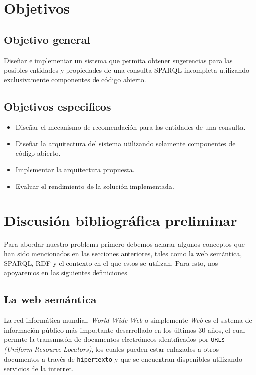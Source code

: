 \documentclass[conference,compsoc]{IEEEtran}
\begin{document}
\section{Objetivos}

    \subsection{Objetivo general}

Diseñar e implementar un sistema que permita obtener sugerencias para las posibles
entidades y propiedades de una consulta SPARQL incompleta utilizando exclusivamente
componentes de código abierto.

    \subsection{Objetivos especificos}

\begin{itemize}
    \item Diseñar el mecanismo de recomendación para las entidades de una consulta.
    \item Diseñar la arquitectura del sistema utilizando solamente componentes de código abierto.
    \item Implementar la arquitectura propuesta.
    \item Evaluar el rendimiento de la solución implementada.
\end{itemize}

\section{Discusión bibliográfica preliminar}

Para abordar nuestro problema primero debemos aclarar algunos conceptos que han sido
mencionados en las secciones anteriores, tales como la web semántica, SPARQL, RDF y el
contexto en el que estos se utilizan. Para esto, nos apoyaremos en las siguientes definiciones.

    \subsection{La web semántica}

La red informática mundial, \textit{World Wide Web} o simplemente \textit{Web} es el sistema de información público más importante
desarrollado en los últimos 30 años, el cual permite la transmisión de documentos electrónicos identificados
por \texttt{URLs} \textit{(Uniform Resource Locators)}, los cuales pueden estar enlazados a otros documentos 
a través de \texttt{hipertexto} y que se encuentran disponibles utilizando servicios de la internet.
\end{document}
